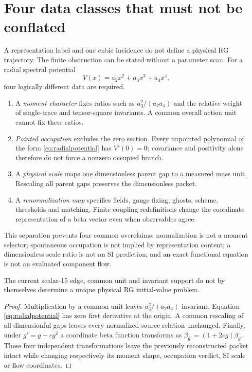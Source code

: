 \section{Four data classes that must not be conflated}
\label{sec:fourclasses}

A representation label and one cubic incidence do not define a physical RG
trajectory.  The finite obstruction can be stated without a parameter scan.
For a radial spectral potential
\begin{equation}
 V(x)=a_2x^2+a_3x^3+a_4x^4,
 \label{eq:radialpotential}
\end{equation}
four logically different data are required.

\begin{enumerate}[label=(\roman*)]
\item A \emph{moment character} fixes ratios such as
  $a_3^2/(a_2a_4)$ and the relative weight of single-trace and tensor-square
  invariants.  A common overall action unit cannot fix these ratios.
\item \emph{Pointed occupation} excludes the zero section.  Every unpointed
  polynomial of the form \eqref{eq:radialpotential} has $V'(0)=0$; covariance
  and positivity alone therefore do not force a nonzero occupied branch.
\item A \emph{physical scale} maps one dimensionless parent gap to a measured
  mass unit.  Rescaling all parent gaps preserves the dimensionless packet.
\item A \emph{renormalization map} specifies fields, gauge fixing, ghosts,
  scheme, thresholds and matching.  Finite coupling redefinitions change the
  coordinate representation of a beta vector even when observables agree.
\end{enumerate}

This separation prevents four common overclaims: normalization is not a
moment selector; spontaneous occupation is not implied by representation
content; a dimensionless scale ratio is not an SI prediction; and an exact
functional equation is not an evaluated component flow.

\begin{proposition}
The current scalar-15 edge, common unit and invariant support do not by
themselves determine a unique physical RG initial-value problem.
\end{proposition}
\begin{proof}
Multiplication by a common unit leaves $a_3^2/(a_2a_4)$ invariant.  Equation
\eqref{eq:radialpotential} has zero first derivative at the origin.  A common
rescaling of all dimensionful gaps leaves every normalized source relation
unchanged.  Finally, under $g'=g+cg^2$ a coordinate beta function transforms
as $\beta_{g'}=(1+2cg)\beta_g$.  These four independent transformations leave
the previously reconstructed packet intact while changing respectively its
moment shape, occupation verdict, SI scale or flow coordinates.
\end{proof}

